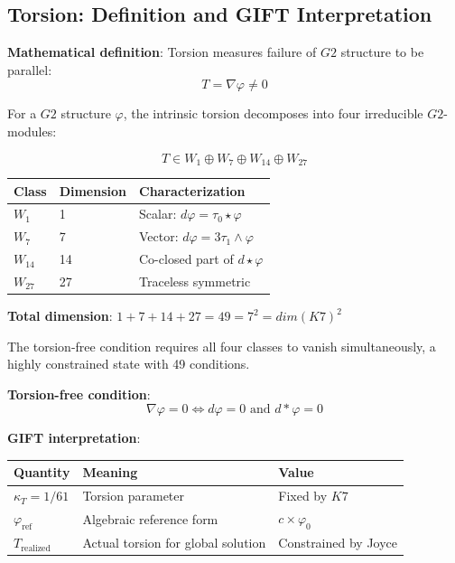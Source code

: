 \documentclass[11pt,a4paper]{article}
\newcommand{\Gtwo}{\mathrm{G}_2}
\newcommand{\Kseven}{K_7}
\newcommand{\dimE}{\mathrm{dim}}
\def\Gtwo{G2}%
\def\Kseven{K7}%
\def\dimE{dim}%
\begin{document}
\subsection{Torsion: Definition and GIFT Interpretation}

\textbf{Mathematical definition}: Torsion measures failure of $\Gtwo$ structure to be parallel:
$$T = \nabla\varphi \neq 0$$

For a $\Gtwo$ structure $\varphi$, the intrinsic torsion decomposes into four irreducible $\Gtwo$-modules:

$$T \in W_1 \oplus W_7 \oplus W_{14} \oplus W_{27}$$

\begin{table}[H]
\centering
\begin{tabular}{lll}
\toprule
Class & Dimension & Characterization \\
\midrule
$W_1$ & 1 & Scalar: $d\varphi = \tau_0 \star\varphi$ \\
$W_7$ & 7 & Vector: $d\varphi = 3\tau_1 \wedge \varphi$ \\
$W_{14}$ & 14 & Co-closed part of $d\star\varphi$ \\
$W_{27}$ & 27 & Traceless symmetric \\
\bottomrule
\end{tabular}
\end{table}

\textbf{Total dimension}: $1 + 7 + 14 + 27 = 49 = 7^2 = \dimE(\Kseven)^2$

The torsion-free condition requires all four classes to vanish simultaneously, a highly constrained state with 49 conditions.

\textbf{Torsion-free condition}:
$$\nabla\varphi = 0 \Leftrightarrow d\varphi = 0 \text{ and } d*\varphi = 0$$

\textbf{GIFT interpretation}:

\begin{table}[H]
\centering
\begin{tabular}{lll}
\toprule
Quantity & Meaning & Value \\
\midrule
$\kappa_T = 1/61$ & Torsion parameter & Fixed by $\Kseven$ \\
$\varphi_{\text{ref}}$ & Algebraic reference form & $c \times \varphi_0$ \\
$T_{\text{realized}}$ & Actual torsion for global solution & Constrained by Joyce \\
\bottomrule
\end{tabular}
\end{table}
\end{document}
